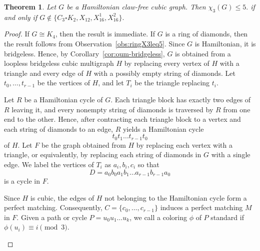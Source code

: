 \documentclass[10pt,a4paper]{article}
\providecommand{\tikzsetnextfilename}[1]{}
\newtheorem{theorem}             {Theorem}
\theoremstyle{case}
\numberwithin{subcase}{case}
\begin{document}
\begin{theorem}\label{thm:ham-clawfree}
Let $G$ be a Hamiltonian claw-free cubic graph. 
Then
$
\chi_3(G)\leq5.
$
if and only if
$
G\notin\{C_3\square K_2,X_{12},X_{16}^{1},X_{16}^{2}\}.
$
\end{theorem}
\begin{proof}
If $G\cong K_4$, then the result is immediate. If $G$ is a ring of
diamonds, then the result follows from
Observation~\ref{obs:ringX3leq5}. Since $G$ is Hamiltonian, it is
bridgeless. Hence, by
Corollary~\ref{cor:oum-bridgeless}, $G$ is obtained from a loopless
bridgeless cubic multigraph $H$ by replacing every vertex of $H$ with
a triangle and every edge of $H$ with a possibly empty string of diamonds.
Let $t_0,\ldots,t_{r-1}$ be the vertices of $H$, and let $T_i$ be the
triangle replacing $t_i$.

Let $R$ be a Hamiltonian cycle of $G$. Each triangle block has exactly
two edges of $R$ leaving it, and every nonempty string of diamonds is
traversed by $R$ from one end to the other. Hence, after contracting
each triangle block to a vertex and each string of diamonds to an edge,
$R$ yields a Hamiltonian cycle
\[
t_0t_1\ldots t_{r-1}t_0
\]
of $H$.
Let $F$ be the graph obtained from $H$ by replacing each vertex with a
triangle, or equivalently, by replacing each string of diamonds in $G$
with a single edge. We label the vertices of $T_i$ as
$a_i,b_i,c_i$ so that
\[
D=a_0b_0a_1b_1\ldots a_{r-1}b_{r-1}a_0
\]
is a cycle in $F$.

Since $H$ is cubic, the edges of $H$ not belonging to the Hamiltonian
cycle form a perfect matching. Consequently,
$C=\{c_0,\ldots,c_{r-1}\}$ induces a perfect matching $M$ in $F$.
Given a path or cycle $P=u_0u_1\ldots u_k$, we call a coloring $\phi$
of $P$ standard if
$
\phi(u_i)\equiv i \pmod 3.
$

\begin{figure}[H]
    \centering


\tikzsetnextfilename{fig-cubic-standard}
\end{figure}
\end{proof}
\end{document}
